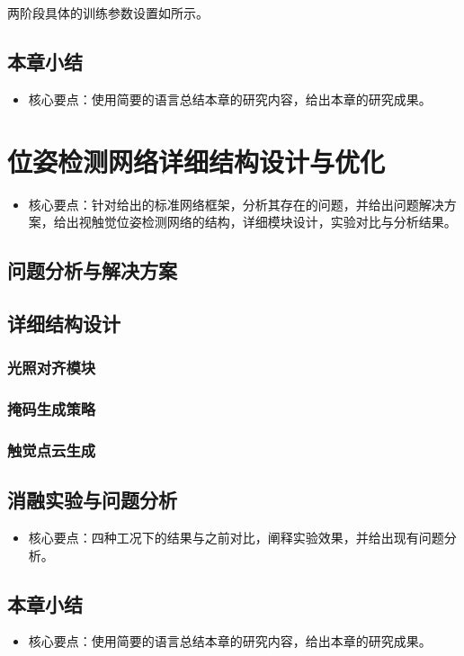 \documentclass{Diploma}
\begin{document}
两阶段具体的训练参数设置如所示。


\section{本章小结}
\begin{itemize}
  \item 核心要点：使用简要的语言总结本章的研究内容，给出本章的研究成果。
\end{itemize}
\chapter{位姿检测网络详细结构设计与优化}
\begin{itemize}
  \item 核心要点：针对给出的标准网络框架，分析其存在的问题，并给出问题解决方案，给出视触觉位姿检测网络的结构，详细模块设计，实验对比与分析结果。
\end{itemize}
\section{问题分析与解决方案}
\section{详细结构设计}
\subsection{光照对齐模块}
\subsection{掩码生成策略}
\subsection{触觉点云生成}
\section{消融实验与问题分析}
\begin{itemize}
  \item 核心要点：四种工况下的结果与之前对比，阐释实验效果，并给出现有问题分析。
\end{itemize}
\section{本章小结}
\begin{itemize}
  \item 核心要点：使用简要的语言总结本章的研究内容，给出本章的研究成果。
\end{itemize}
\end{document}
